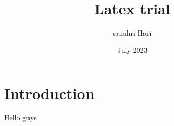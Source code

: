 \documentclass{article}
\title{Latex trial}
\author{srnuhri Hari}
\date{July 2023}
\begin{document}
\maketitle

\section{Introduction}
Hello guys
\end{document}
